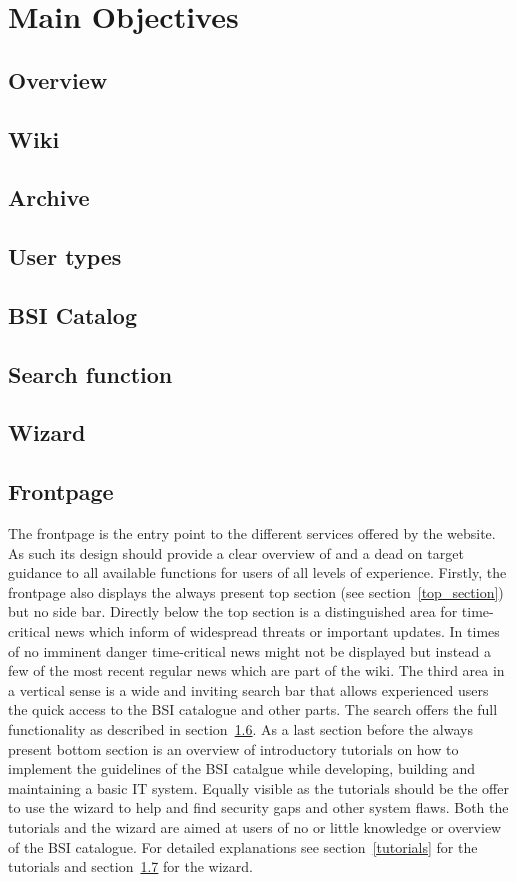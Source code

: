 \chapter{Main Objectives}
\section{Overview}
\section{Wiki}
\section{Archive}
\section{User types}
\section{BSI Catalog}
\section{Search function}
\label{search_function}

\section{Wizard}
\label{wizard}

\section{Frontpage}
The frontpage is the entry point to the different services offered by the website. 
As such its design should provide a clear overview of and a dead on target guidance to all available functions for users of all levels of experience.
Firstly, the frontpage also displays the always present top section (see section~\ref{top_section}) but no side bar.
Directly below the top section is a distinguished area for time-critical news which inform of widespread threats or important updates.
In times of no imminent danger time-critical news might not be displayed but instead a few of the most recent regular news which are part of the wiki.
The third area in a vertical sense is a wide and inviting search bar that allows experienced users the quick access to the BSI catalogue and other parts. 
The search offers the full functionality as described in section~\ref{search_function}.
As a last section before the always present bottom section is an overview of introductory tutorials on how to implement the guidelines of the BSI catalgue while developing, building and maintaining a basic IT system.
Equally visible as the tutorials should be the offer to use the wizard to help and find security gaps and other system flaws.
Both the tutorials and the wizard are aimed at users of no or little knowledge or overview of the BSI catalogue.
For detailed explanations see section~\ref{tutorials} for the tutorials and section~\ref{wizard} for the wizard.


